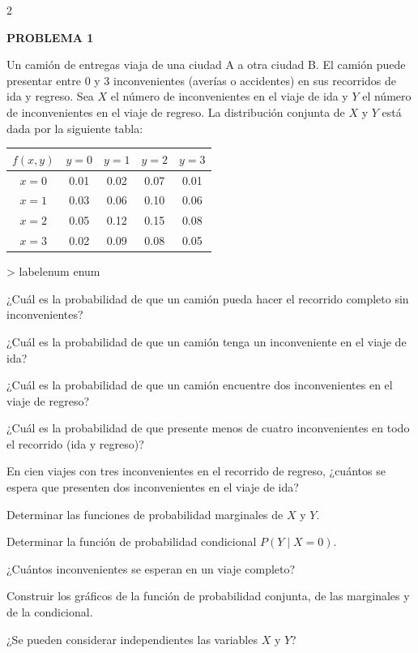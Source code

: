 \documentclass[10pt,letterpaper]{article}
\makeatletter
\renewenvironment{enumerate}
  {\ifnum \@enumdepth >\thr@@\@toodeep\else
   \advance\@enumdepth\@ne
   \edef\@enumctr{enum\romannumeral\the\@enumdepth}%
   \expandafter\list\csname label\@enumctr\endcsname
     {\usecounter\@enumctr
      \setlength{\topsep}{3pt}%
      \setlength{\itemsep}{2pt}%
      \setlength{\parsep}{0pt}%
      \setlength{\partopsep}{0pt}%
      \setlength{\leftmargin}{1.6em}%
      \setlength{\labelsep}{0.4em}}%
   \fi}
  {\endlist}
\newcommand{\problema}[1]{%
  \vspace{2pt}
  \noindent\textbf{\large PROBLEMA #1}\par
  \vspace{2pt}
}
\makeatother
\begin{document}
\pagestyle{empty}

\begin{multicols}{2}
\raggedcolumns

\problema{1}

Un camión de entregas viaja de una ciudad A a otra ciudad B. El camión puede
presentar entre 0 y 3 inconvenientes (averías o accidentes) en sus recorridos
de ida y regreso. Sea \(X\) el número de inconvenientes en el viaje de ida y
\(Y\) el número de inconvenientes en el viaje de regreso. La distribución
conjunta de \(X\) y \(Y\) está dada por la siguiente tabla:

\begin{center}
\small
\setlength{\tabcolsep}{5pt}
\begin{tabular}{c|cccc}
\toprule
\(f(x,y)\) & \(y=0\) & \(y=1\) & \(y=2\) & \(y=3\) \\
\midrule
\(x=0\) & 0.01 & 0.02 & 0.07 & 0.01 \\
\(x=1\) & 0.03 & 0.06 & 0.10 & 0.06 \\
\(x=2\) & 0.05 & 0.12 & 0.15 & 0.08 \\
\(x=3\) & 0.02 & 0.09 & 0.08 & 0.05 \\
\bottomrule
\end{tabular}
\end{center}

\begin{enumerate}
\item ¿Cuál es la probabilidad de que un camión pueda hacer el recorrido
completo sin inconvenientes?
\item ¿Cuál es la probabilidad de que un camión tenga un inconveniente en el
viaje de ida?
\item ¿Cuál es la probabilidad de que un camión encuentre dos inconvenientes
en el viaje de regreso?
\item ¿Cuál es la probabilidad de que presente menos de cuatro inconvenientes
en todo el recorrido (ida y regreso)?
\item En cien viajes con tres inconvenientes en el recorrido de regreso,
¿cuántos se espera que presenten dos inconvenientes en el viaje de ida?
\item Determinar las funciones de probabilidad marginales de \(X\) y \(Y\).
\item Determinar la función de probabilidad condicional \(P(Y\mid X=0)\).
\item ¿Cuántos inconvenientes se esperan en un viaje completo?
\item Construir los gráficos de la función de probabilidad conjunta, de las
marginales y de la condicional.
\item ¿Se pueden considerar independientes las variables \(X\) y \(Y\)?
\end{enumerate}


\end{multicols}
\end{document}
